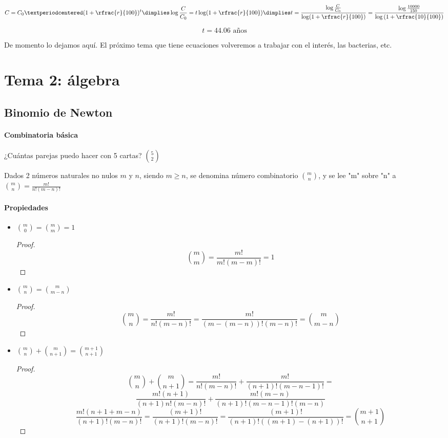 \documentclass[palatino,nosec]{Docencia}
\begin{document}
\[
	C = C_0·(1+\rfrac{r}{100})^{t} \dimplies \log\frac{C}{C_0} = t\log(1+\rfrac{r}{100}) \dimplies t = \frac{\log\frac{C}{C_0}}{\log(1+\rfrac{r}{100})} = \frac{\log\frac{10000}{150}}{\log\left(1+\rfrac{10}{100}\right)} 
\]

\[
	t = 44.06\text{ años}
\]

De momento lo dejamos aquí. El próximo tema que tiene ecuaciones volveremos a trabajar con el interés, las bacterias, etc.


\section{Tema 2: álgebra}

\subsection{Binomio de Newton}

\paragraph{Combinatoria básica} ¿Cuántas parejas puedo hacer con 5 cartas? $\binom{5}{2}$

\begin{defn} Dados 2 números naturales no nulos $m$ y $n$, siendo $m≥n$, se denomina número combinatorio $\binom{m}{n}$, y se lee "m" sobre "n" a $\binom{m}{n} = \frac{m!}{n!(m-n)!}$
\end{defn}

\paragraph{Propiedades}
\begin{itemize}
	\item $\binom{m}{0}=\binom{m}{m}=1$
	\begin{proof}
		\[\binom{m}{m} = \frac{m!}{m!(m-m)!} = 1\]
	\end{proof}
	\item $\binom{m}{n}=\binom{m}{m-n}$ 
	\begin{proof}
		\[\binom{m}{n} = \frac{m!}{n!(m-n)!} = \frac{m!}{(m-(m-n))!(m-n)!} = \binom{m}{m-n} \]
	\end{proof}
	\item $\binom{m}{n} + \binom{m}{n+1}=\binom{m+1}{n+1}$
	\begin{proof}
		\[
			\binom{m}{n} + \binom{m}{n+1} = \frac{m!}{n!(m-n)!} + \frac{m!}{(n+1)!(m-n-1)!} = 
		\]
		\[
			\frac{m!(n+1)}{(n+1)n!(m-n)!} + \frac{m!(m-n)}{(n+1)!(m-n-1)!(m-n)}
		\]
		\[
			\frac{m!(n+1+m-n)}{(n+1)!(m-n)!} = \frac{(m+1)!}{(n+1)!(m-n)!} = 
		\frac{(m+1)!}{(n+1)!((m+1)-(n+1))!} = \binom{m+1}{n+1}
		\]
	\end{proof}
\end{itemize}
\end{document}
